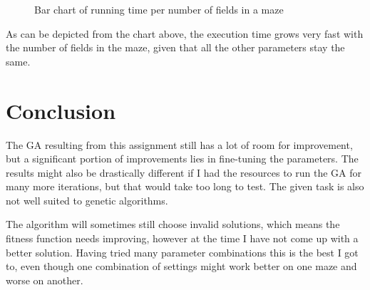 \documentclass{article}
\begin{document}
\begin{description}
\begin{figure}[H]
	\begin{minipage}{.9\linewidth}
		\centering
	\end{minipage}%
	\caption{Bar chart of running time per number of fields in a maze}
\end{figure}

As can be depicted from the chart above, the execution time grows very fast with the number of fields in the maze, given that all the other parameters stay the same.

\section{Conclusion}
The GA resulting from this assignment still has a lot of room for improvement, but a significant portion of improvements lies in fine-tuning the parameters. The results might also be drastically different if I had the resources to run the GA for many more iterations, but that would take too long to test. The given task is also not well suited to genetic algorithms.

The algorithm will sometimes still choose invalid solutions, which means the fitness function needs improving, however at the time I have not come up with a better solution. Having tried many parameter combinations this is the best I got to, even though one combination of settings might work better on one maze and worse on another. 

\end{description}
\end{document}
